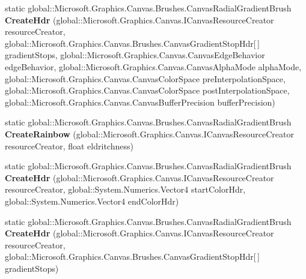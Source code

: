 \begin{DoxyCompactItemize}
static global\+::\+Microsoft.\+Graphics.\+Canvas.\+Brushes.\+Canvas\+Radial\+Gradient\+Brush {\bfseries Create\+Hdr} (global\+::\+Microsoft.\+Graphics.\+Canvas.\+I\+Canvas\+Resource\+Creator resource\+Creator, global\+::\+Microsoft.\+Graphics.\+Canvas.\+Brushes.\+Canvas\+Gradient\+Stop\+Hdr\mbox{[}$\,$\mbox{]} gradient\+Stops, global\+::\+Microsoft.\+Graphics.\+Canvas.\+Canvas\+Edge\+Behavior edge\+Behavior, global\+::\+Microsoft.\+Graphics.\+Canvas.\+Canvas\+Alpha\+Mode alpha\+Mode, global\+::\+Microsoft.\+Graphics.\+Canvas.\+Canvas\+Color\+Space pre\+Interpolation\+Space, global\+::\+Microsoft.\+Graphics.\+Canvas.\+Canvas\+Color\+Space post\+Interpolation\+Space, global\+::\+Microsoft.\+Graphics.\+Canvas.\+Canvas\+Buffer\+Precision buffer\+Precision)
\item 
\mbox{\label{class_microsoft_1_1_graphics_1_1_canvas_1_1_brushes_1_1_canvas_radial_gradient_brush_a19932ca8ae9416ca37a762c1184257db}} 
static global\+::\+Microsoft.\+Graphics.\+Canvas.\+Brushes.\+Canvas\+Radial\+Gradient\+Brush {\bfseries Create\+Rainbow} (global\+::\+Microsoft.\+Graphics.\+Canvas.\+I\+Canvas\+Resource\+Creator resource\+Creator, float eldritchness)
\item 
\mbox{\label{class_microsoft_1_1_graphics_1_1_canvas_1_1_brushes_1_1_canvas_radial_gradient_brush_a9fc3b8b39e6337c070642178c6fb106c}} 
static global\+::\+Microsoft.\+Graphics.\+Canvas.\+Brushes.\+Canvas\+Radial\+Gradient\+Brush {\bfseries Create\+Hdr} (global\+::\+Microsoft.\+Graphics.\+Canvas.\+I\+Canvas\+Resource\+Creator resource\+Creator, global\+::\+System.\+Numerics.\+Vector4 start\+Color\+Hdr, global\+::\+System.\+Numerics.\+Vector4 end\+Color\+Hdr)
\item 
\mbox{\label{class_microsoft_1_1_graphics_1_1_canvas_1_1_brushes_1_1_canvas_radial_gradient_brush_aef0da396142c3d6724253585940535e0}} 
static global\+::\+Microsoft.\+Graphics.\+Canvas.\+Brushes.\+Canvas\+Radial\+Gradient\+Brush {\bfseries Create\+Hdr} (global\+::\+Microsoft.\+Graphics.\+Canvas.\+I\+Canvas\+Resource\+Creator resource\+Creator, global\+::\+Microsoft.\+Graphics.\+Canvas.\+Brushes.\+Canvas\+Gradient\+Stop\+Hdr\mbox{[}$\,$\mbox{]} gradient\+Stops)
\item 

\end{DoxyCompactItemize}
